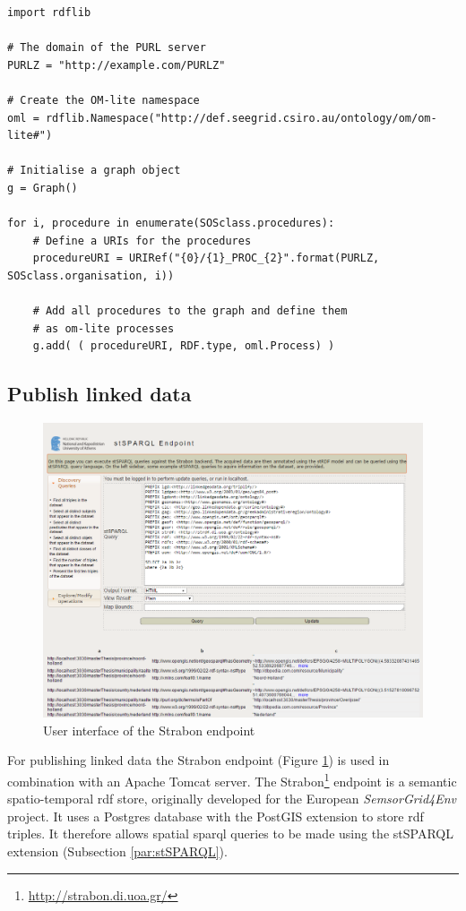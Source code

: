 \begin{lstlisting}[float,caption={Creating an RDF graph object with the Python package RDFlib}, label={lst:rdflib}]
import rdflib

# The domain of the PURL server
PURLZ = "http://example.com/PURLZ"

# Create the OM-lite namespace 
oml = rdflib.Namespace("http://def.seegrid.csiro.au/ontology/om/om-lite#")

# Initialise a graph object
g = Graph()

for i, procedure in enumerate(SOSclass.procedures):
	# Define a URIs for the procedures
	procedureURI = URIRef("{0}/{1}_PROC_{2}".format(PURLZ, SOSclass.organisation, i))
	
	# Add all procedures to the graph and define them   
	# as om-lite processes
	g.add( ( procedureURI, RDF.type, oml.Process) )

\end{lstlisting}  

\subsection{Publish linked data}

\begin{figure}
	\centering
	\includegraphics[width=\linewidth]{figs/Strabon.PNG}
	\caption{User interface of the Strabon endpoint}
	\label{fig:Strabon}
\end{figure}

For publishing linked data the Strabon endpoint (Figure \ref{fig:Strabon}) is used in combination with an Apache Tomcat server. The Strabon\footnote{\url{http://strabon.di.uoa.gr/}} endpoint is a semantic spatio-temporal \ac{rdf} store, originally developed for the European  \textit{SemsorGrid4Env} project. It uses a Postgres database with the PostGIS extension to store \ac{rdf} triples. It therefore allows spatial \ac{sparql} queries to be made using the stSPARQL extension (Subsection \ref{par:stSPARQL}).  

